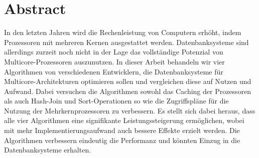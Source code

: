 \chapter*{Abstract}
\label{sec:Abstract}

In den letzten Jahren wird die Rechenleistung von Computern erhöht, indem Prozessoren mit mehreren Kernen ausgestattet werden. Datenbanksysteme sind allerdings zurzeit noch nicht in der Lage das vollständige Potenzial von Multicore-Prozessoren auszunutzen. In dieser Arbeit behandeln wir vier Algorithmen von verschiedenen Entwicklern, die Datenbanksysteme für Multicore-Architekturen optimieren sollen und vergleichen diese auf Nutzen und Aufwand. Dabei versuchen die Algorithmen sowohl das Caching der Prozessoren als auch Hash-Join und Sort-Operationen so wie die Zugriffspläne für die Nutzung der Mehrkernprozessoren zu verbessern. Es stellt sich dabei heraus, dass alle vier Algorithmen eine signifikante Leistungssteigerung ermöglichen, wobei mit mehr Implementierungsaufwand auch bessere Effekte erzielt werden. Die Algorithmen verbessern eindeutig die Performanz und könnten Einzug in die Datenbanksysteme erhalten.